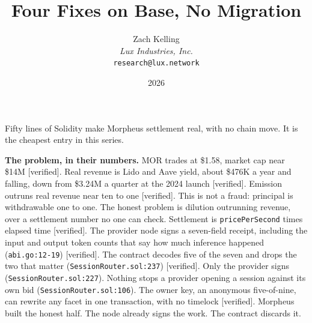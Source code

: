 \documentclass[11pt,a4paper]{article}
\title{Four Fixes on Base, No Migration}
\author{Zach Kelling\\\textit{Lux Industries, Inc.}\\\texttt{research@lux.network}}
\date{2026}
\newcommand{\code}[1]{\texttt{\small #1}}
\begin{document}
\luxcoverpage
\sloppy

\par
\vspace{0.8ex}
\par
\vspace{0.7ex}
\noindent{\color{rule}\rule{\linewidth}{1.1pt}}\par
\vspace{1.0ex}

\noindent
Fifty lines of Solidity make Morpheus settlement real, with no chain move. It is the
cheapest entry in this series.

\vspace{0.6ex}
\noindent\textbf{The problem, in their numbers.}
MOR trades at \$1.58, market cap near \$14M [verified]. Real revenue is Lido and Aave yield,
about \$476K a year and falling, down from \$3.24M a quarter at the 2024 launch [verified].
Emission outruns real revenue near ten to one [verified]. This is not a fraud: principal is
withdrawable one to one. The honest problem is dilution outrunning revenue, over a settlement
number no one can check. Settlement is \code{pricePerSecond} times elapsed time [verified]. The
provider node signs a seven-field receipt, including the input and output token counts that say
how much inference happened (\code{abi.go:12-19}) [verified]. The contract decodes five of the
seven and drops the two that matter (\code{SessionRouter.sol:237}) [verified]. Only the provider
signs (\code{SessionRouter.sol:227}). Nothing stops a provider opening a session against its own
bid (\code{SessionRouter.sol:106}). The owner key, an anonymous five-of-nine, can rewrite any
facet in one transaction, with no timelock [verified]. Morpheus built the honest half. The node
already signs the work. The contract discards it.
\end{document}
